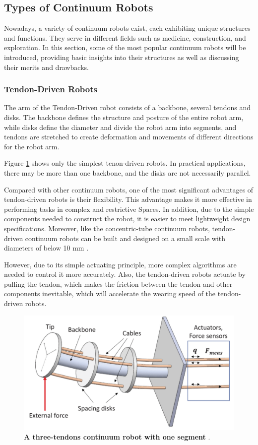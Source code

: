 \subsection{Types of Continuum Robots}
Nowadays, a variety of continuum robots exist, each exhibiting unique structures and functions. They serve in different fields 
such as medicine, construction, and exploration. In this section, some of the most popular continuum robots will be introduced, 
providing basic insights into their structures as well as discussing their merits and drawbacks. \\
\vspace{-10mm}
\subsubsection{Tendon-Driven Robots}
The arm of the Tendon-Driven robot consists of a backbone, several tendons and disks. The backbone defines the structure and 
posture of the entire robot arm, while disks define the diameter and divide the robot arm into segments, and tendons are 
stretched to create deformation and movements of different directions for the robot arm. 

Figure \ref{fig:3tendon_1segment_CR} shows only the simplest tenon-driven robots. In practical applications, there 
may be more than one backbone, and the disks are not necessarily parallel. 

Compared with other continuum robots, one of the most significant advantages of tendon-driven robots is their flexibility. 
This advantage makes it more effective in performing tasks in complex and restrictive Spaces. In addition, due to the simple 
components needed to construct the robot, it is easier to meet lightweight design specifications. Moreover, like the 
concentric-tube continuum robots, tendon-driven continuum robots can be built and designed on a small scale with diameters of 
below 10 mm \cite{amanov2021tendon}.

However, due to its simple actuating principle, more complex algorithms are needed to control it more accurately. Also, the 
tendon-driven robots actuate by pulling the tendon, which makes the friction between the tendon and other components inevitable, 
which will accelerate the wearing speed of the tendon-driven robots.
\begin{figure}[H] %
    \centering
    \captionsetup{labelsep=colon}
    \includegraphics[width=.7\textwidth]{Image/LR/3tendon_1segment_CR.PNG} 
    \caption[A three-tendons continuum robot with one segment]
    {\centering \textbf{A three-tendons continuum robot with one segment} \cite{3tendon_1segment_CR}.}
    \label{fig:3tendon_1segment_CR}
\end{figure}
